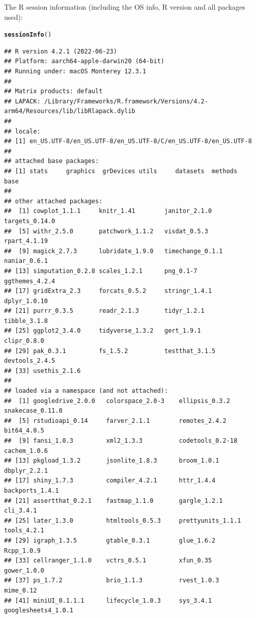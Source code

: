 \documentclass{article}\usepackage[]{graphicx}\usepackage[]{xcolor}
\makeatletter
\newcommand{\hlstd}[1]{\textcolor[rgb]{0.345,0.345,0.345}{#1}}%
\newcommand{\hlkwd}[1]{\textcolor[rgb]{0.737,0.353,0.396}{\textbf{#1}}}%
\newenvironment{kframe}{%
 \def\at@end@of@kframe{}%
 \ifinner\ifhmode%
  \def\at@end@of@kframe{\end{minipage}}%
  \begin{minipage}{\columnwidth}%
 \fi\fi%
 \def\FrameCommand##1{\hskip\@totalleftmargin \hskip-\fboxsep
 \colorbox{shadecolor}{##1}\hskip-\fboxsep
     \hskip-\linewidth \hskip-\@totalleftmargin \hskip\columnwidth}%
 \MakeFramed {\advance\hsize-\width
   \@totalleftmargin\z@ \linewidth\hsize
   \@setminipage}}%
 {\par\unskip\endMakeFramed%
 \at@end@of@kframe}
\newenvironment{knitrout}{}{} %
\makeatother
\begin{document}
The R session information (including the OS info, R version and all
packages used):

\begin{knitrout}
\color{fgcolor}\begin{kframe}
\begin{alltt}
\hlkwd{sessionInfo}\hlstd{()}
\end{alltt}
\begin{verbatim}
## R version 4.2.1 (2022-06-23)
## Platform: aarch64-apple-darwin20 (64-bit)
## Running under: macOS Monterey 12.3.1
## 
## Matrix products: default
## LAPACK: /Library/Frameworks/R.framework/Versions/4.2-arm64/Resources/lib/libRlapack.dylib
## 
## locale:
## [1] en_US.UTF-8/en_US.UTF-8/en_US.UTF-8/C/en_US.UTF-8/en_US.UTF-8
## 
## attached base packages:
## [1] stats     graphics  grDevices utils     datasets  methods   base     
## 
## other attached packages:
##  [1] cowplot_1.1.1     knitr_1.41        janitor_2.1.0     targets_0.14.0   
##  [5] withr_2.5.0       patchwork_1.1.2   visdat_0.5.3      rpart_4.1.19     
##  [9] magick_2.7.3      lubridate_1.9.0   timechange_0.1.1  naniar_0.6.1     
## [13] simputation_0.2.8 scales_1.2.1      png_0.1-7         ggthemes_4.2.4   
## [17] gridExtra_2.3     forcats_0.5.2     stringr_1.4.1     dplyr_1.0.10     
## [21] purrr_0.3.5       readr_2.1.3       tidyr_1.2.1       tibble_3.1.8     
## [25] ggplot2_3.4.0     tidyverse_1.3.2   gert_1.9.1        clipr_0.8.0      
## [29] pak_0.3.1         fs_1.5.2          testthat_3.1.5    devtools_2.4.5   
## [33] usethis_2.1.6    
## 
## loaded via a namespace (and not attached):
##  [1] googledrive_2.0.0   colorspace_2.0-3    ellipsis_0.3.2      snakecase_0.11.0   
##  [5] rstudioapi_0.14     farver_2.1.1        remotes_2.4.2       bit64_4.0.5        
##  [9] fansi_1.0.3         xml2_1.3.3          codetools_0.2-18    cachem_1.0.6       
## [13] pkgload_1.3.2       jsonlite_1.8.3      broom_1.0.1         dbplyr_2.2.1       
## [17] shiny_1.7.3         compiler_4.2.1      httr_1.4.4          backports_1.4.1    
## [21] assertthat_0.2.1    fastmap_1.1.0       gargle_1.2.1        cli_3.4.1          
## [25] later_1.3.0         htmltools_0.5.3     prettyunits_1.1.1   tools_4.2.1        
## [29] igraph_1.3.5        gtable_0.3.1        glue_1.6.2          Rcpp_1.0.9         
## [33] cellranger_1.1.0    vctrs_0.5.1         xfun_0.35           gower_1.0.0        
## [37] ps_1.7.2            brio_1.1.3          rvest_1.0.3         mime_0.12          
## [41] miniUI_0.1.1.1      lifecycle_1.0.3     sys_3.4.1           googlesheets4_1.0.1

\end{verbatim}
\end{kframe}
\end{knitrout}
\end{document}
